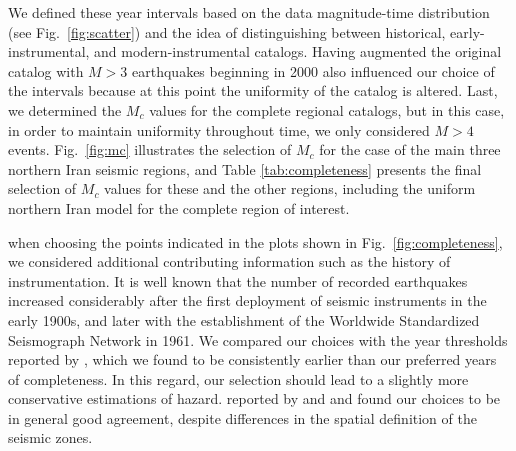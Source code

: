 We defined these year intervals based on the data magnitude-time distribution (see Fig.~\ref{fig:scatter}) and the idea of distinguishing between historical, early-instrumental, and modern-instrumental catalogs. Having augmented the original catalog with $M>3$ earthquakes beginning in 2000 also influenced our choice of the intervals because at this point the uniformity of the catalog is altered. Last, we determined the $M_c$ values for the complete regional catalogs, but in this case, in order to maintain uniformity throughout time, we only considered $M>4$ events.  Fig.~\ref{fig:mc} illustrates the selection of $M_c$ for the case of the main three northern Iran seismic regions, and Table \ref{tab:completeness} presents the final selection of $M_c$ values for these and the other regions, including the uniform northern Iran model for the complete region of interest.

 when choosing the points indicated in the plots shown in Fig.~\ref{fig:completeness}, we considered additional contributing information such as the history of instrumentation. It is well known that the number of recorded earthquakes increased considerably after the first deployment of seismic instruments in the early 1900s, and later with the establishment of the Worldwide Standardized Seismograph Network in 1961. We compared our choices with the year thresholds reported by \citet{Zare2014}, which we found to be consistently earlier than our preferred years of completeness. In this regard, our selection should lead to a slightly more conservative estimations of hazard.  reported by \citet{Karimiparidari2013} and \citet{Khodaverdian_2016_BSSA} and found our choices to be in general good agreement, despite differences in the spatial definition of the seismic zones.


